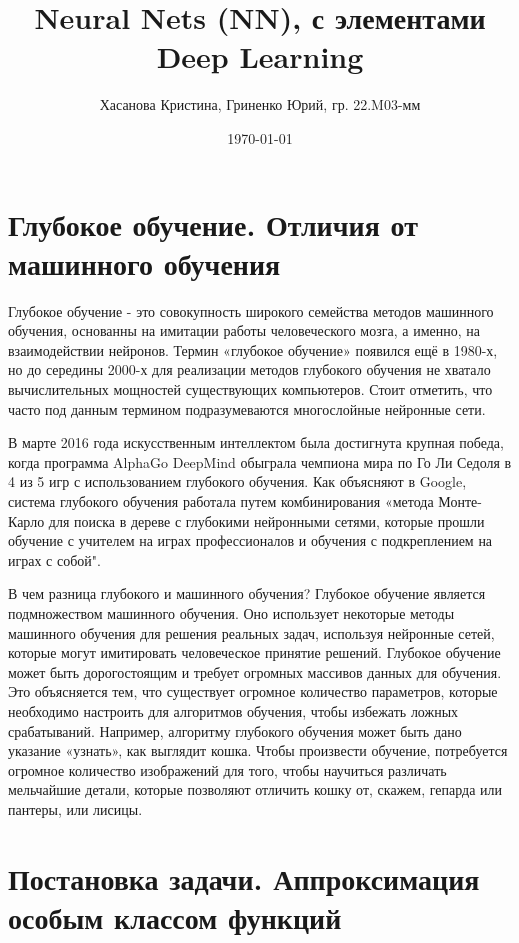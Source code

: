 \documentclass{article}
\title{Neural Nets (NN), с элементами Deep Learning}
\author{Хасанова Кристина, Гриненко Юрий, гр. 22.M03-мм}
\date{\today}
\begin{document}
	\maketitle
	\tableofcontents
	\newpage
	\section{Глубокое обучение. Отличия от машинного обучения}
	
	Глубокое обучение - это совокупность широкого семейства методов машинного обучения, основанны на имитации работы человеческого мозга, а именно, на взаимодействии нейронов. Термин «глубокое обучение» появился ещё в 1980-х, но до середины 2000-х для реализации методов глубокого обучения не хватало вычислительных мощностей существующих компьютеров. Стоит отметить, что часто под данным термином подразумеваются многослойные нейронные сети.
	
	В марте 2016 года искусственным интеллектом была достигнута крупная победа, когда программа AlphaGo DeepMind обыграла чемпиона мира по Го Ли Седоля в 4 из 5 игр с использованием глубокого обучения. Как объясняют в Google, система глубокого обучения работала путем комбинирования «метода Монте-Карло для поиска в дереве с глубокими нейронными сетями, которые прошли обучение с учителем на играх профессионалов и обучения с подкреплением на играх с собой".
	
	В чем разница глубокого и машинного обучения?
	Глубокое обучение является подмножеством машинного обучения. Оно использует некоторые методы машинного обучения для решения реальных задач, используя нейронные сетей, которые могут имитировать человеческое принятие решений. Глубокое обучение может быть дорогостоящим и требует огромных массивов данных для обучения. Это объясняется тем, что существует огромное количество параметров, которые необходимо настроить для алгоритмов обучения, чтобы избежать ложных срабатываний. Например, алгоритму глубокого обучения может быть дано указание «узнать», как выглядит кошка. Чтобы произвести обучение, потребуется огромное количество изображений для того, чтобы научиться различать мельчайшие детали, которые позволяют отличить кошку от, скажем, гепарда или пантеры, или лисицы.
	
	
	\section{Постановка задачи. Аппроксимация особым классом функций}
	
\end{document}
